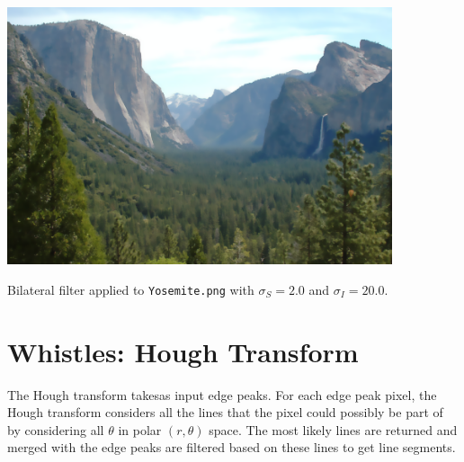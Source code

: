 \documentclass[letterpaper]{article}
\begin{document}
\begin{center}
  \includegraphics[width=0.85\textwidth]{bilateraltask.png}

  Bilateral filter applied to \texttt{Yosemite.png} with $\sigma_S = 2.0$ and
  $\sigma_I = 20.0$.
\end{center}

\section*{Whistles: Hough Transform}

The Hough transform takesas input edge peaks. For each edge peak pixel, the
Hough transform considers all the lines that the pixel could possibly be part of
by considering all $\theta$ in polar $\left(r, \theta\right)$ space. The most
likely lines are returned and merged with the edge peaks are filtered based on
these lines to get line segments.
\end{document}
